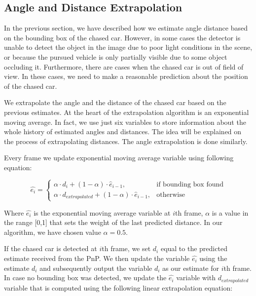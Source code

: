 \subsection{Angle and Distance Extrapolation}
In the previous section, we have described how we estimate angle distance based on the bounding box of the chased car. However, in some cases the detector is unable to detect the object in the image due to poor light conditions in the scene, or because the pursued vehicle is only partially visible due to some object occluding it. Furthermore, there are cases when the chased car is out of field of view. In these cases, we need to make a reasonable prediction about the position of the chased car. \par


We extrapolate the angle and the distance of the chased car based on the previous estimates. At the heart of the extrapolation algorithm is an exponential moving average. In fact, we use just six variables to store information about the whole history of estimated angles and distances. The idea will be explained on the process of extrapolating distances. The angle extrapolation is done similarly. \par


Every frame we update exponential moving average variable using following equation:\par


\begin{equation}
    \hat{e_{i}}=
    \begin{cases}
      \alpha\cdot d_i + (1-\alpha)\cdot \hat{e}_{i-1}, & \text{if bounding box found} \\
      \alpha\cdot d_{extrapolated} + (1-\alpha)\cdot \hat{e}_{i-1}, & \text{otherwise}
    \end{cases}
\end{equation}

Where $\hat{e_{i}}$ is the exponential moving average variable at $i$th frame, $\alpha$ is a value in the range [0,1] that sets the weight of the last predicted distance. In our algorithm, we have chosen value $\alpha=0.5$. \par

If the chased car is detected at $i$th frame, we set $d_i$ equal to the predicted estimate received from the PnP. We then update the variable $\hat{e_{i}}$ using the estimate $d_i$ and subsequently output the variable $d_i$ as our estimate for $i$th frame. In case no bounding box was detected, we update the $\hat{e_{i}}$ variable with $d_{extrapolated}$ variable that is computed using the following linear extrapolation equation:


